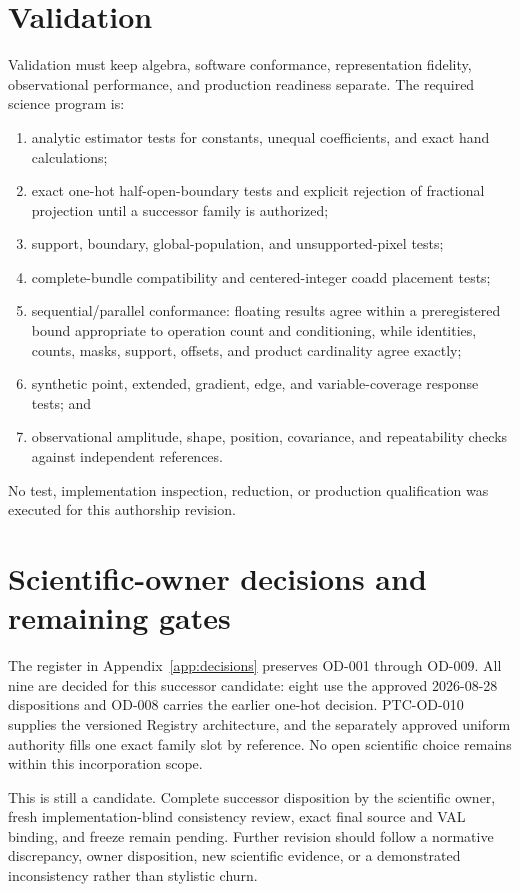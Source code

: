 \documentclass[10pt]{article}
\begin{document}
\section{Validation}\label{sec:validation}
Validation must keep algebra, software conformance, representation fidelity,
observational performance, and production readiness separate. The required
science program is:
\begin{enumerate}[label=\textbf{\arabic*.},leftmargin=*]
\item analytic estimator tests for constants, unequal coefficients, and exact
hand calculations;
\item exact one-hot half-open-boundary tests and explicit rejection of
fractional projection until a successor family is authorized;
\item support, boundary, global-population, and unsupported-pixel tests;
\item complete-bundle compatibility and centered-integer coadd placement
tests;
\item sequential/parallel conformance: floating results agree within a
preregistered bound appropriate to operation count and conditioning, while
identities, counts, masks, support, offsets, and product cardinality agree
exactly;
\item synthetic point, extended, gradient, edge, and variable-coverage
response tests; and
\item observational amplitude, shape, position, covariance, and repeatability
checks against independent references.
\end{enumerate}
No test, implementation inspection, reduction, or production qualification
was executed for this authorship revision.

\section{Scientific-owner decisions and remaining gates}\label{sec:decisions}
The register in Appendix~\ref{app:decisions} preserves OD-001 through OD-009.
All nine are decided for this successor candidate: eight use the approved
2026-08-28 dispositions and OD-008 carries the earlier one-hot decision.
PTC-OD-010 supplies the versioned Registry architecture, and the separately
approved uniform authority fills one exact family slot by reference. No open
scientific choice remains within this incorporation scope.

This is still a candidate. Complete successor disposition by the scientific
owner, fresh implementation-blind consistency review, exact final source and
VAL binding, and freeze remain pending. Further revision should follow a
normative discrepancy, owner disposition, new scientific evidence, or a
demonstrated inconsistency rather than stylistic churn.
\end{document}
